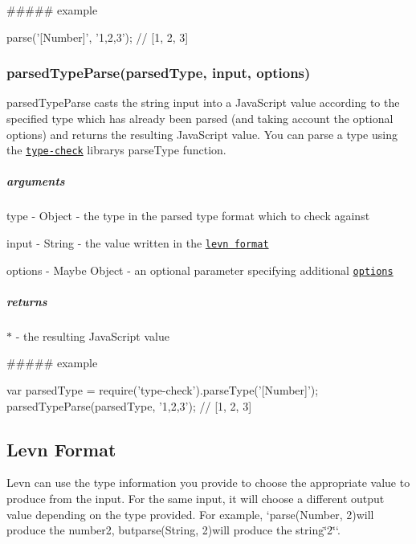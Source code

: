 \#\#\#\#\# example 
\begin{DoxyCode}
parse(\textcolor{stringliteral}{'[Number]'}, \textcolor{stringliteral}{'1,2,3'}); \textcolor{comment}{// [1, 2, 3]}
\end{DoxyCode}


\subsubsection*{parsed\+Type\+Parse(parsed\+Type, input, options)}

{\ttfamily parsed\+Type\+Parse} casts the string {\ttfamily input} into a Java\+Script value according to the specified {\ttfamily type} which has already been parsed (and taking account the optional {\ttfamily options}) and returns the resulting Java\+Script value. You can parse a type using the \href{https://github.com/gkz/type-check}{\tt type-\/check} library\textquotesingle{}s {\ttfamily parse\+Type} function.

\subparagraph*{arguments}


\begin{DoxyItemize}
\item type -\/ {\ttfamily Object} -\/ the type in the parsed type format which to check against
\item input -\/ {\ttfamily String} -\/ the value written in the \href{#levn-format}{\tt levn format}
\item options -\/ {\ttfamily Maybe Object} -\/ an optional parameter specifying additional \href{#options}{\tt options}
\end{DoxyItemize}

\subparagraph*{returns}

{\ttfamily $\ast$} -\/ the resulting Java\+Script value

\#\#\#\#\# example 
\begin{DoxyCode}
var parsedType = require(\textcolor{stringliteral}{'type-check'}).parseType(\textcolor{stringliteral}{'[Number]'});
parsedTypeParse(parsedType, \textcolor{stringliteral}{'1,2,3'}); \textcolor{comment}{// [1, 2, 3]}
\end{DoxyCode}


\subsection*{Levn Format}

Levn can use the type information you provide to choose the appropriate value to produce from the input. For the same input, it will choose a different output value depending on the type provided. For example, `parse(\textquotesingle{}Number\textquotesingle{}, \textquotesingle{}2\textquotesingle{}){\ttfamily will produce the number}2{\ttfamily , but}parse(\textquotesingle{}String\textquotesingle{}, \textquotesingle{}2\textquotesingle{}){\ttfamily will produce the string}\char`\"{}2\char`\"{}`.

